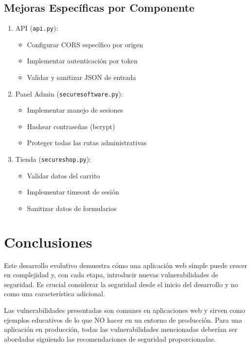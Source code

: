 \subsection{Mejoras Específicas por Componente}
\begin{enumerate}
    \item API (\texttt{api.py}):
    \begin{itemize}
        \item Configurar CORS específico por origen
        \item Implementar autenticación por token
        \item Validar y sanitizar JSON de entrada
    \end{itemize}
    
    \item Panel Admin (\texttt{securesoftware.py}):
    \begin{itemize}
        \item Implementar manejo de sesiones
        \item Hashear contraseñas (bcrypt)
        \item Proteger todas las rutas administrativas
    \end{itemize}
    
    \item Tienda (\texttt{secureshop.py}):
    \begin{itemize}
        \item Validar datos del carrito
        \item Implementar timeout de sesión
        \item Sanitizar datos de formularios
    \end{itemize}
\end{enumerate}

\section{Conclusiones}
Este desarrollo evolutivo demuestra cómo una aplicación web simple puede crecer en complejidad y, con cada etapa, introducir nuevas vulnerabilidades de seguridad. Es crucial considerar la seguridad desde el inicio del desarrollo y no como una característica adicional.

Las vulnerabilidades presentadas son comunes en aplicaciones web y sirven como ejemplos educativos de lo que NO hacer en un entorno de producción. Para una aplicación en producción, todas las vulnerabilidades mencionadas deberían ser abordadas siguiendo las recomendaciones de seguridad proporcionadas.

